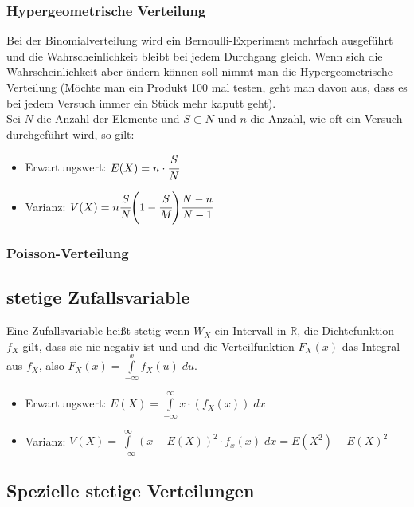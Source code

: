 \documentclass[a4paper]{scrartcl}
\begin{document}
            \subsubsection{Hypergeometrische Verteilung}
                Bei der Binomialverteilung wird ein Bernoulli-Experiment mehrfach ausgeführt und die Wahrscheinlichkeit bleibt bei jedem Durchgang gleich. Wenn sich die Wahrscheinlichkeit
                aber ändern können soll nimmt man die Hypergeometrische Verteilung (Möchte man ein Produkt 100 mal testen, geht man davon aus, dass es bei jedem Versuch immer ein Stück mehr kaputt geht).\\
                Sei \(N\) die Anzahl der Elemente und \(S \subset N\) und \(n\) die Anzahl, wie oft ein Versuch durchgeführt wird, so gilt: 
                \begin{itemize}
                    \item Erwartungswert: \(E(X) = n \cdot \cfrac{S}{N}\)
                    \item Varianz: \(V(X) = n \cfrac{S}{N} \Bigg(1 - \cfrac{S}{M} \Bigg) \cfrac{N - n}{N - 1} \)
                \end{itemize}
            \subsubsection{Poisson-Verteilung}
        \subsection{stetige Zufallsvariable}
            Eine Zufallsvariable heißt stetig wenn \(W_X\) ein Intervall in \(\mathbb{R}\), die Dichtefunktion \(f_X\) gilt, dass sie nie negativ ist und und die Verteilfunktion 
            \(F_X(x)\) das Integral aus \(f_X\), also \(F_X(x) = \int\limits_{-\infty }^x f_X(u) \; du\).
            \begin{itemize}
                \item Erwartungswert: \(E(X) = \int\limits_{-\infty}^{\infty} x \cdot (f_X(x)) \; dx \)
                \item Varianz: \(V(X) = \int\limits_{-\infty}^{\infty} (x - E(X))^2 \cdot f_x(x) \; dx = E(X^2) - E(X)^2 \)
            \end{itemize}
        \subsection{Spezielle stetige Verteilungen}
\end{document}
